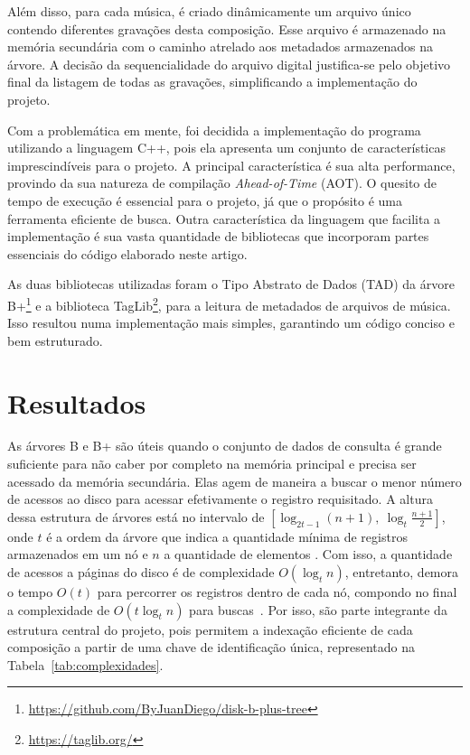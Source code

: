 \documentclass[12pt]{article}
\begin{document}
Além disso, para cada música, é criado dinâmicamente um arquivo único contendo diferentes gravações 
desta composição. Esse arquivo é armazenado na memória secundária com o caminho
atrelado aos metadados armazenados na árvore. A decisão da sequencialidade do
arquivo digital justifica-se pelo objetivo final da listagem de todas as
gravações, simplificando a implementação do projeto.

Com a problemática em mente, foi decidida a implementação do programa utilizando
a linguagem C++, pois ela apresenta um conjunto de características
imprescindíveis para o projeto. A principal característica é sua alta
performance, provindo da sua natureza de compilação \emph{Ahead-of-Time} (AOT).
O quesito de tempo de execução é essencial para o projeto, já que o propósito é
uma ferramenta eficiente de busca. Outra característica da linguagem que
facilita a implementação é sua vasta quantidade de bibliotecas que incorporam
partes essenciais do código elaborado neste artigo.

As duas bibliotecas utilizadas foram o Tipo Abstrato de Dados (TAD) da árvore
B+\footnote{\url{https://github.com/ByJuanDiego/disk-b-plus-tree}} e a
biblioteca TagLib\footnote{\url{https://taglib.org/}}, para a leitura de
metadados de arquivos de música. Isso resultou numa implementação mais simples,
garantindo um código conciso e bem estruturado.

\section{Resultados} \label{sec:results}
As árvores B e B\nolinebreak+ são úteis quando o conjunto de dados de consulta é
grande suficiente para não caber por completo na memória principal e precisa ser
acessado da memória secundária. Elas agem de maneira a buscar o menor número de
acessos ao disco para acessar efetivamente o registro requisitado. A altura
dessa estrutura de árvores está no intervalo de $[\log_{2t-1} (n+1),\ \log_t
\frac{n + 1}{2}]$, onde $t$ é a ordem da árvore que indica a quantidade mínima
de registros armazenados em um nó e $n$ a quantidade de elementos
\cite{clrs:22}. Com isso, a quantidade de acessos a páginas do disco é de
complexidade $O(\log_t n)$, entretanto, demora o tempo $O(t)$ para percorrer os
registros dentro de cada nó, compondo no final a complexidade de $O(t \log_t n)$
para buscas~\cite{clrs:22,Pm:10}. Por isso, são parte integrante da estrutura
central do projeto, pois permitem a indexação eficiente de cada composição a
partir de uma chave de identificação única, representado na
Tabela~\ref{tab:complexidades}.
\end{document}
